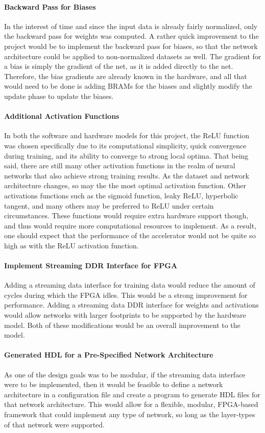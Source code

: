 \paragraph{Backward Pass for Biases}
In the interest of time and since the input data is already fairly normalized, only the backward pass for weights was computed. A rather quick improvement to the project would be to implement the backward pass for biases, so that the network architecture could be applied to non-normalized datasets as well. The gradient for a bias is simply the gradient of the net, as it is added directly to the net. Therefore, the bias gradients are already known in the hardware, and all that would need to be done is adding BRAMs for the biases and slightly modify the update phase to update the biases.

\paragraph{Additional Activation Functions}
In both the software and hardware models for this project, the ReLU function was chosen specifically due to its computational simplicity, quick convergence during training, and its ability to converge to strong local optima. That being said, there are still many other activation functions in the realm of neural networks that also achieve strong training results. As the dataset and network architecture changes, so may the the most optimal activation function. Other activations functions such as the sigmoid function, leaky ReLU, hyperbolic tangent, and many others may be preferred to ReLU under certain circumstances. These functions would require extra hardware support though, and thus would require more computational resources to implement. As a result, one should expect that the performance of the accelerator would not be quite so high as with the ReLU activation function.

\paragraph{Implement Streaming DDR Interface for FPGA}
Adding a streaming data interface for training data would reduce the amount of cycles during which the FPGA idles. This would be a strong improvement for performance. Adding a streaming data DDR interface for weights and activations would allow networks with larger footprints to be supported by the hardware model. Both of these modifications would be an overall improvement to the model.

\paragraph{Generated HDL for a Pre-Specified Network Architecture}
As one of the design goals was to be modular, if the streaming data interface were to be implemented, then it would be feasible to define a network architecture in a configuration file and create a program to generate HDL files for that network architecture. This would allow for a flexible, modular, FPGA-based framework that could implement any type of network, so long as the layer-types of that network were supported.
